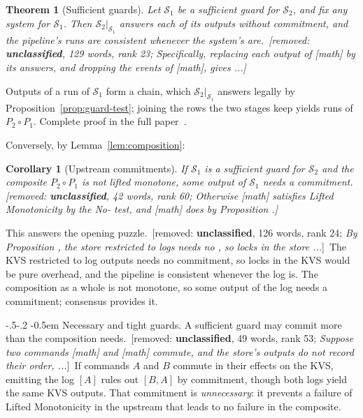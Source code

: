 \documentclass[sigconf]{cidr-2027}
\makeatletter
\newtheorem{theorem}{Theorem}
\newtheorem{corollary}{Corollary}
\theoremstyle{remark}
\renewcommand\paragraph{\@startsection{paragraph}{4}{\z@}%
  {-.5\baselineskip \@plus -2\p@ \@minus -.2\p@}%
  {-0.5em}%
  {\normalfont\bfseries}}
\newcommand{\commitment}{commitment\xspace}
\newcommand{\commitments}{commitments\xspace}
\newcommand{\Spec}{\mathcal{S}}
\newcommand{\fullproof}{Complete proof in the full paper~\cite{hellerstein2026completecalmfull}.}
\renewenvironment{proof}[1][\proofname]{\par
  \pushQED{\qed}\normalfont\topsep2\p@\relax
  \trivlist\item[\@proofindent\hskip\labelsep{\@proofnamefont #1\@addpunct{.}}]\ignorespaces
}{\popQED\endtrivlist\@endpefalse}
\newcommand{\removednote}[1]{{\color{cutred}\footnotesize\,[removed: #1]\,}}
\makeatother
\begin{document}
\begin{theorem}[Sufficient guards]
\label{thm:sufficient-guards}
\textcolor{newblue}{Let $\Spec_1$ be a sufficient guard for $\Spec_2$, and fix any system for
$\Spec_1$.} \textcolor{newblue}{Then
$\Spec_2|_{\Spec_1}$ answers each of its outputs without \commitment, and the
pipeline's runs are consistent whenever the system's are.} \removednote{\textbf{unclassified}, 129 words, rank 23; \textit{Specifically, replacing each output of [math] by its answers, and dropping the events of [math], gives ...}}
\end{theorem}
\begin{proof}[Proof sketch]
\textcolor{newblue}{Outputs of a run of $\Spec_1$ form a chain, which $\Spec_2|_{\Spec_1}$
answers legally by Proposition~\ref{prop:guard-test}; joining the rows the
two stages keep yields runs of $P_2\circ P_1$.} \textcolor{newblue}{\fullproof}
\end{proof}

\textcolor{newblue}{Conversely, by Lemma~\ref{lem:composition}:}

\begin{corollary}[Upstream \commitments]
\label{cor:upstream-commitments}
If $\Spec_1$ is a sufficient guard for $\Spec_2$ and the composite
$P_2\circ P_1$ is not lifted monotone, some output of $\Spec_1$ needs a
\commitment. \removednote{\textbf{unclassified}, 42 words, rank 60; \textit{Otherwise [math] satisfies Lifted Monotonicity by the No- test, and [math] does by Proposition .}}
\end{corollary}

This answers the opening puzzle. \removednote{\textbf{unclassified}, 126 words, rank 24; \textit{By Proposition , the store restricted to logs needs no , so locks in the store ...}} \textcolor{newblue}{The KVS restricted to log outputs needs no
\commitment, so locks in the KVS would be pure overhead, and the pipeline is
consistent whenever the log is.} \textcolor{newblue}{The composition as a whole is not monotone, so some
output of the log needs a \commitment; consensus provides it.}

\paragraph{Necessary and tight guards.}
\textcolor{newblue}{A sufficient guard may commit more than the composition
needs.} \removednote{\textbf{unclassified}, 49 words, rank 53; \textit{Suppose two commands [math] and [math] commute, and the store's outputs do not record their order, ...}} \textcolor{newblue}{If commands $A$ and $B$ commute in their effects on the KVS,
emitting the log $[A]$ rules out $[B,A]$ by \commitment, though both logs
yield the same KVS outputs.} That \commitment is \emph{unnecessary}: it prevents a
failure of Lifted Monotonicity in the upstream that leads to no failure in the
composite.
\end{document}
